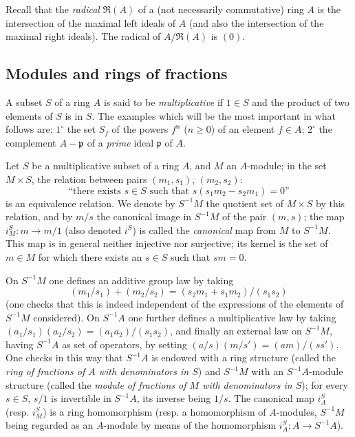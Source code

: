 \begin{env}[1.1.2]
\label{0.1.1.2}
Recall that the \emph{radical} $\mathfrak{R}(A)$ of a (not necessarily commutative) ring $A$ is the intersection of the maximal left ideals of $A$ (and also the intersection of the maximal right ideals).
The radical of $A/\mathfrak{R}(A)$ is $(0)$.
\end{env}

\subsection{Modules and rings of fractions}
\label{subsection:0.1.2}

\begin{env}[1.2.1]
\label{0.1.2.1}
A subset $S$ of a ring $A$ is said to be \emph{multiplicative} if $1\in S$ and the product of two elements of $S$ is in $S$.
The examples which will be the most important in what follows are: $1^\circ$ the set $S_f$ of the powers $f^n$ ($n\geq 0$) of an element $f\in A$; $2^\circ$ the complement $A-\mathfrak{p}$ of a \emph{prime} ideal $\mathfrak{p}$ of $A$.
\end{env}

\begin{env}[1.2.2]
\label{0.1.2.2}
Let $S$ be a multiplicative subset of a ring $A$, and $M$ an $A$-module; in the set $M\times S$, the relation between pairs $(m_1,s_1)$, $(m_2,s_2)$:
\[
  \text{``there exists $s\in S$ such that $s(s_1m_2-s_2m_1)=0$''}
\]
is an equivalence relation.
We denote by $S^{-1}M$ the quotient set of $M\times S$ by this relation, and by $m/s$ the canonical image in $S^{-1}M$ of the pair $(m,s)$; the map $i_M^S:m\to m/1$ (also denoted $i^S$) is called the \emph{canonical} map from $M$ to $S^{-1}M$.
This map is in general neither injective nor surjective; its kernel is the set of $m\in M$ for which there exists an $s\in S$ such that $sm=0$.

On $S^{-1}M$ one defines an additive group law by taking
\[
  (m_1/s_1)+(m_2/s_2)=(s_2m_1+s_1m_2)/(s_1s_2)
\]
(one checks that this is indeed independent of the expressions of the elements of $S^{-1}M$ considered).
On $S^{-1}A$ one further defines a multiplicative law by taking $(a_1/s_1)(a_2/s_2)=(a_1a_2)/(s_1s_2)$, and finally an external law on $S^{-1}M$, having $S^{-1}A$ as set of operators, by setting $(a/s)(m/s')=(am)/(ss')$.
One checks in this way that $S^{-1}A$ is endowed with a ring structure (called the \emph{ring of fractions of $A$ with denominators in $S$}) and $S^{-1}M$ with an $S^{-1}A$-module structure (called the \emph{module of fractions of $M$ with denominators in $S$}); for every $s\in S$, $s/1$ is invertible in $S^{-1}A$, its inverse being $1/s$.
The canonical map $i_A^S$ (resp. $i_M^S$) is a ring homomorphism (resp. a homomorphism of $A$-modules, $S^{-1}M$ being regarded as an $A$-module by means of the homomorphism $i_A^S:A\to S^{-1}A$).
\end{env}

